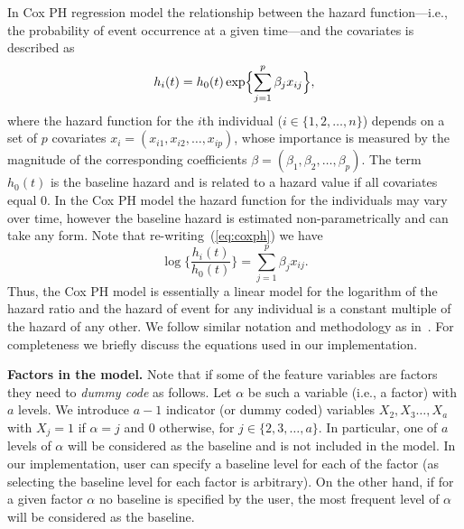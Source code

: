  
In Cox PH regression model the relationship between the hazard function---i.e., the probability of event occurrence at a given time---and the covariates is described as
\begin{equation}
h_i(t)=h_0(t)\exp\Bigl\{ \sum_{j=1}^{p} \beta_jx_{ij} \Bigr\}, \label{eq:coxph}
\end{equation} 
where the hazard function for the $i$th individual ($i\in\{1,2,\ldots,n\}$) depends on a set of $p$ covariates $x_i=(x_{i1},x_{i2},\ldots,x_{ip})$, whose importance is measured by the magnitude of the corresponding coefficients 
$\beta=(\beta_1,\beta_2,\ldots,\beta_p)$. The term $h_0(t)$ is the baseline hazard and is related to a hazard value if all covariates equal 0. 
In the Cox PH model the hazard function for the individuals may vary over time, however the baseline hazard is estimated non-parametrically and can take any form.
Note that re-writing~(\ref{eq:coxph}) we have 
\begin{equation*}
\log\biggl\{ \frac{h_i(t)}{h_0(t)} \biggr\} = \sum_{j=1}^{p} \beta_jx_{ij}.
\end{equation*}
Thus, the Cox PH model is essentially a linear model for the logarithm of the hazard ratio and the hazard of event for any individual is a constant multiple of the hazard of any other. 
We follow similar notation and methodology as in~\cite[Sec.~3]{collett2003:kaplanmeier}.
For completeness we briefly discuss the equations used in our implementation.


\textbf{Factors in the model.} 
Note that if some of the feature variables are factors they need to {\it dummy code} as follows. 
Let $\alpha$ be such a variable (i.e., a factor) with $a$ levels. 
We introduce $a-1$ indicator (or dummy coded) variables $X_2,X_3\ldots,X_a$ with $X_j=1$ if $\alpha=j$ and 0 otherwise, for $j\in\{ 2,3,\ldots,a\}$.
In particular, one of $a$ levels of $\alpha$ will be considered as the baseline and is not included in the model.
In our implementation, user can specify a baseline level for each of the factor (as selecting the baseline level for each factor is arbitrary). 
On the other hand, if for a given factor $\alpha$ no baseline is specified by the user, the most frequent level of $\alpha$ will be considered as the baseline.   


